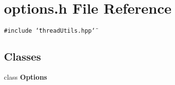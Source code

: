 \section{options.h File Reference}
\label{options_8h}
{\tt \#include \char`\"{}thread\-Utils.hpp\char`\"{}}\par
\subsection*{Classes}
\begin{CompactItemize}
\item 
class {\bf Options}
\end{CompactItemize}
